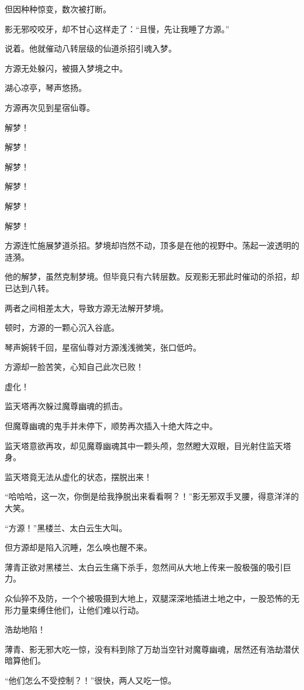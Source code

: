 \begin{this_body}
但因种种惊变，数次被打断。

影无邪咬咬牙，却不甘心这样走了：“且慢，先让我睡了方源。”

说着。他就催动八转层级的仙道杀招引魂入梦。

方源无处躲闪，被摄入梦境之中。

湖心凉亭，琴声悠扬。

方源再次见到星宿仙尊。

解梦！

解梦！

解梦！

解梦！

解梦！

解梦！

方源连忙施展梦道杀招。梦境却岿然不动，顶多是在他的视野中。荡起一波透明的涟漪。

他的解梦，虽然克制梦境。但毕竟只有六转层数。反观影无邪此时催动的杀招，却已达到八转。

两者之间相差太大，导致方源无法解开梦境。

顿时，方源的一颗心沉入谷底。

琴声婉转千回，星宿仙尊对方源浅浅微笑，张口低吟。

方源却一脸苦笑，心知自己此次已败！

虚化！

监天塔再次躲过魔尊幽魂的抓击。

但魔尊幽魂的鬼手并未停下，顺势再次插入十绝大阵之中。

监天塔意欲再攻，却见魔尊幽魂其中一颗头颅，忽然瞪大双眼，目光射住监天塔身。

监天塔竟无法从虚化的状态，摆脱出来！

“哈哈哈，这一次，你倒是给我挣脱出来看看啊？！”影无邪双手叉腰，得意洋洋的大笑。

“方源！”黑楼兰、太白云生大叫。

但方源却是陷入沉睡，怎么唤也醒不来。

薄青正欲对黑楼兰、太白云生痛下杀手，忽然间从大地上传来一股极强的吸引巨力。

众仙猝不及防，一个个被吸摄到大地上，双腿深深地插进土地之中，一股恐怖的无形力量束缚住他们，让他们难以行动。

浩劫地陷！

薄青、影无邪大吃一惊，没有料到除了万劫当空针对魔尊幽魂，居然还有浩劫潜伏暗算他们。

“他们怎么不受控制？！”很快，两人又吃一惊。


\end{this_body}
